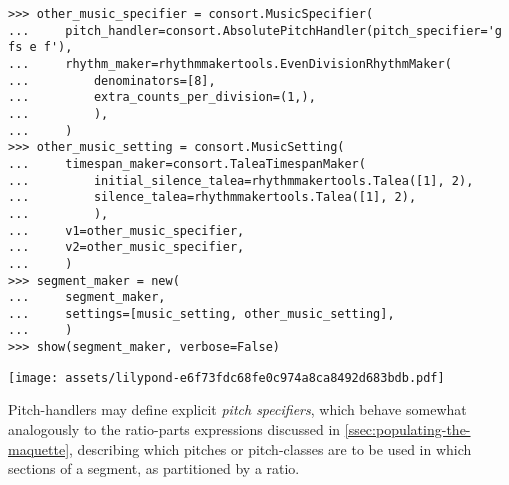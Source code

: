 \begin{abjadbookoutput}
\begin{singlespacing}
\vspace{-0.5\baselineskip}
\begin{lstlisting}
>>> other_music_specifier = consort.MusicSpecifier(
...     pitch_handler=consort.AbsolutePitchHandler(pitch_specifier='g fs e f'),
...     rhythm_maker=rhythmmakertools.EvenDivisionRhythmMaker(
...         denominators=[8],
...         extra_counts_per_division=(1,),
...         ),
...     )
>>> other_music_setting = consort.MusicSetting(
...     timespan_maker=consort.TaleaTimespanMaker(
...         initial_silence_talea=rhythmmakertools.Talea([1], 2),
...         silence_talea=rhythmmakertools.Talea([1], 2),
...         ),
...     v1=other_music_specifier,
...     v2=other_music_specifier,
...     )
>>> segment_maker = new(
...     segment_maker,
...     settings=[music_setting, other_music_setting],
...     )
>>> show(segment_maker, verbose=False)
\end{lstlisting}
\noindent\texttt{[image: assets/lilypond-e6f73fdc68fe0c974a8ca8492d683bdb.pdf]}
\end{singlespacing}
\end{abjadbookoutput}

\noindent Pitch-handlers may define explicit \emph{pitch specifiers}, which
behave somewhat analogously to the ratio-parts expressions discussed in
\autoref{ssec:populating-the-maquette}, describing which pitches or
pitch-classes are to be used in which sections of a segment, as partitioned by
a ratio.

\begin{comment}
<abjad>
pitch_specifier = consort.PitchSpecifier(
    pitch_segments=(
        "c' e' g'",
        "fs' g' a'",
        "b d'",
        ),
    ratio=(1, 2, 3),
    )
pitch_choice_timespans = consort.PitchHandler.get_pitch_choice_timespans(
    pitch_specifier=pitch_specifier,
    duration=segment_maker.desired_duration,
    )
print(format(pitch_choice_timespans))
</abjad>
\end{comment}

